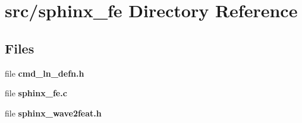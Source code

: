 \section{src/sphinx\+\_\+fe Directory Reference}
\label{dir_d8c91649ada281f16a03908005e3aeeb}
\subsection*{Files}
\begin{DoxyCompactItemize}
\item 
file {\bfseries cmd\+\_\+ln\+\_\+defn.\+h}
\item 
file {\bfseries sphinx\+\_\+fe.\+c}
\item 
file {\bfseries sphinx\+\_\+wave2feat.\+h}
\end{DoxyCompactItemize}
